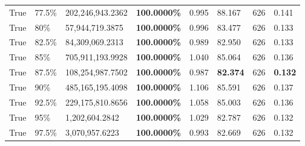 \begin{table}[H]
\begin{tabular}{lllrllll}
\cline{1-8} \cline{2-8}
True & 77.5\% & 202,246,943.2362 & \bfseries \color{red} 100.0000\% & 0.995 & 88.167 & 626 & 0.141 \\
\cline{1-8} \cline{2-8}
True & 80\% & 57,944,719.3875 & \bfseries \color{red} 100.0000\% & 0.996 & 83.477 & 626 & 0.133 \\
\cline{1-8} \cline{2-8}
True & 82.5\% & 84,309,069.2313 & \bfseries \color{red} 100.0000\% & 0.989 & 82.950 & 626 & 0.133 \\
\cline{1-8} \cline{2-8}
True & 85\% & 705,911,193.9928 & \bfseries \color{red} 100.0000\% & 1.040 & 85.064 & 626 & 0.136 \\
\cline{1-8} \cline{2-8}
True & 87.5\% & 108,254,987.7502 & \bfseries \color{red} 100.0000\% & 0.987 & \bfseries \color{red} 82.374 & 626 & \bfseries \color{red} 0.132 \\
\cline{1-8} \cline{2-8}
True & 90\% & 485,165,195.4098 & \bfseries \color{red} 100.0000\% & 1.106 & 85.591 & 626 & 0.137 \\
\cline{1-8} \cline{2-8}
True & 92.5\% & 229,175,810.8656 & \bfseries \color{red} 100.0000\% & 1.058 & 85.003 & 626 & 0.136 \\
\cline{1-8} \cline{2-8}
True & 95\% & 1,202,604.2842 & \bfseries \color{red} 100.0000\% & 1.029 & 82.787 & 626 & 0.132 \\
\cline{1-8} \cline{2-8}
True & 97.5\% & 3,070,957.6223 & \bfseries \color{red} 100.0000\% & 0.993 & 82.669 & 626 & 0.132 \\
\cline{1-8} \cline{2-8}
\bottomrule
\end{tabular}
\end{table}
